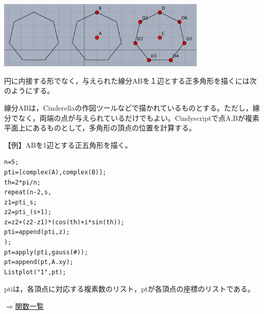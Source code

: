 \documentclass[papersize,a4paper,12pt,uplatex]{jsarticle}
\begin{document}
\begin{description}
\hspace{10mm}\includegraphics[bb=0.00 0.00 541.03 175.01,width=10cm]{Fig/polygonplot2.pdf}

\hspace{10mm}


円に内接する形でなく，与えられた線分ABを１辺とする正多角形を描くには次のようにする。

線分ABは，Cinderellaの作図ツールなどで描かれているものとする。ただし，線分でなく，両端の点が与えられているだけでもよい。Cindyscriptで点A,Bが複素平面上にあるものとして，多角形の頂点の位置を計算する。

\vspace{\baselineskip}
【例】ABを1辺とする正五角形を描く。

\begin{verbatim}
n=5;
pti=[complex(A),complex(B)];
th=2*pi/n;
repeat(n-2,s,
z1=pti_s;
z2=pti_(s+1);
z=z2+(z2-z1)*(cos(th)+i*sin(th));
pti=append(pti,z);
);
pt=apply(pti,gauss(#));
pt=append(pt,A.xy);
Listplot("1",pt);
\end{verbatim}
ptiは，各頂点に対応する複素数のリスト，ptが各頂点の座標のリストである。 

\begin{flushright}\hyperlink{functionlist}{$\Rightarrow$関数一覧}\end{flushright}

\end{description}

\end{document}
